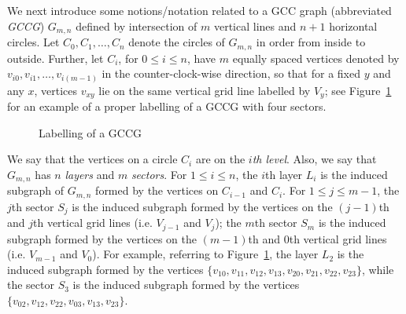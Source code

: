 \documentclass[12pt]{article}
\numberwithin{equation}{section}
\begin{document}
We next introduce some notions/notation related to a GCC graph (abbreviated {\em GCCG}) $G_{m,n}$ defined by intersection of $m$ vertical lines and $n+1$ horizontal circles.  Let $C_0, C_1, \ldots, C_n$ denote the circles of $G_{m,n}$ in order from inside to outside. Further, let $C_i$, for $0\leq i\leq n$, have $m$ equally spaced vertices denoted by $v_{i0},v_{i1},\ldots,v_{i(m-1)}$ in the counter-clock-wise direction, so that for a fixed $y$ and any $x$, vertices $v_{xy}$ lie on the same vertical grid line labelled by $V_y$; see Figure~\ref{GCC-4-labelled} for an example of a proper labelling of a GCCG with four sectors.

 \begin{figure}[!htbp]
 \begin{center}

\caption{Labelling of a GCCG}\label{GCC-4-labelled}
\end{center}
\end{figure}

We say that the vertices on a circle $C_i$ are on the {\em $i$th level}. Also, we say that $G_{m,n}$ has $n$ {\em layers} and $m$ {\em sectors}. For $1\leq i\leq n$, the $i$th layer $L_i$ is the induced subgraph of  $G_{m,n}$ formed by the vertices on $C_{i-1}$ and $C_i$. For $1\leq j\leq m-1$, the $j$th sector $S_j$ is the induced subgraph formed by the vertices on the $(j-1)$th and $j$th vertical grid lines (i.e. $V_{j-1}$ and $V_j$); the $m$th sector $S_m$ is  the induced subgraph formed by the vertices on the $(m-1)$th and $0$th vertical grid lines (i.e. $V_{m-1}$ and $V_0$). For example, referring to Figure~\ref{GCC-4-labelled}, the layer $L_2$ is the induced subgraph formed by the vertices $\{v_{10}, v_{11},v_{12},v_{13},v_{20},v_{21},v_{22}, v_{23}\}$, while the sector $S_3$ is the induced subgraph formed by the vertices $\{v_{02}, v_{12},v_{22},v_{03},v_{13},v_{23}\}$.
\end{document}
